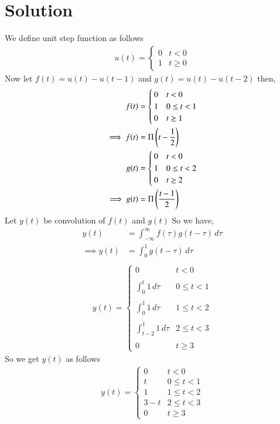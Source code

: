 \documentclass[journal,12pt,twocolumn]{IEEEtran}
\begin{document}
\section{Solution}
We define unit step function as follows 
\begin{align}
    u(t) =  \begin{cases} 
        0 & t < 0 \\
        1 & t\geq 0
   \end{cases}
\end{align}
Now let $f(t)=u(t)-u(t-1)$ and $g(t)=u(t)-u(t-2)$ then,
\begin{align}
    f(t) &=  \begin{cases} 
        0 & t < 0 \\
        1 & 0\leq t<1\\
        0 & t\geq 1
   \end{cases}\\
   \implies f(t) &= \Pi\left(t-\frac{1}{2}\right)\\
   g(t) &=  \begin{cases} 
        0 & t < 0 \\
        1 & 0\leq t<2\\
        0 & t\geq 2
   \end{cases}\\
   \implies g(t) &= \Pi\left(\frac{t-1}{2}\right)
\end{align}
Let $y(t)$ be convolution of $f(t)$ and $g(t)$ So we have,
\begin{align}
    y(t) &= \int_{-\infty}^{\infty}f(\tau)g(t-\tau)\,d\tau\\
    \implies y(t) &= \int_{0}^{1}g(t-\tau)\,d\tau\\
\end{align}
\begin{align}
    y(t) =  \begin{cases} 
        0 & t < 0 \\ \\
        \int_0^t 1\,d\tau & 0\leq t<1\\ \\
        \int_0^1 1\,d\tau & 1\leq t<2\\ \\
        \int_{t-2}^1 1\,d\tau & 2\leq t<3\\ \\
        0 & t\geq 3
   \end{cases}
\end{align}
So we get $y(t)$ as follows
\begin{align}
    y(t) =  \begin{cases} 
        0 & t < 0 \\ 
        t & 0\leq t<1\\ 
        1 & 1\leq t<2\\
        3-t & 2\leq t<3\\
        0 & t\geq 3
   \end{cases}
\end{align}
\end{document}
